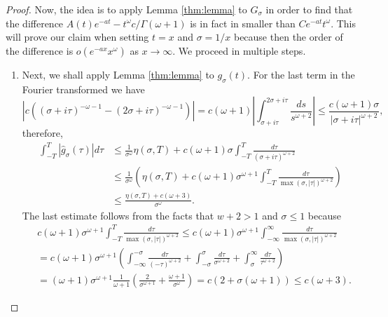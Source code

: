 \begin{proof}
Now, the idea is to apply Lemma \ref{thm:lemma} to $G_\sigma$ in order to find that the difference $A(t)e^{-at} - t^\omega c/\Gamma(\omega + 1)$ is in fact in smaller than $C e^{-at} t^\omega$. This will prove our claim when setting $t = x$ and $\sigma = 1/x$ because then the order of the difference is $o(e^{-ax} x^\omega)$ as $x \to \infty$.
We proceed in multiple steps.
\begin{enumerate}
    \item Next, we shall apply Lemma \ref{thm:lemma} to $g_\sigma(t)$. 
    For the last term in the Fourier transformed we have
    \begin{equation*}
        |c ( (\sigma + i\tau)^{-\omega-1} - (2\sigma + i\tau)^{-\omega - 1})| = c (\omega + 1) \left| \int_{\sigma + i\tau}^{2\sigma + i\tau} \frac{ds}{s^{\omega + 2}} \right| \leq \frac{c (\omega + 1)\sigma}{|\sigma + i\tau|^{\omega+2}}, 
    \end{equation*}
    therefore,  
    \begin{align}
        \int_{-T}^T |\hat{g}_\sigma(\tau)| d\tau 
        &\leq \frac{1}{\sigma^\omega} \eta(\sigma, T) + c (\omega + 1) \sigma \int_{-T}^T \frac{d\tau}{(\sigma + i\tau)^{\omega + 2}} \nonumber \\
        &\leq \frac{1}{\sigma^{\omega}} \left(  \eta(\sigma, T) + c (\omega + 1) \sigma^{\omega + 1}  \int_{-T}^T \frac{d\tau}{\max(\sigma, |\tau|)^{\omega + 2}}  \right) \nonumber \\
        &\leq \frac{\eta(\sigma, T) + c (\omega + 3)}{\sigma^{\omega}} \label{eq:ghatestimate}.
    \end{align}
    The last estimate follows from the facts that $w + 2 > 1$ and $\sigma \leq 1$ because
    \begin{align*}
        &c (\omega + 1) \sigma^{\omega + 1} \int_{-T}^T \frac{d\tau}{\max(\sigma, |\tau|)^{\omega + 2}}
        \leq c (\omega + 1) \sigma^{\omega + 1}  \int_{-\infty}^\infty \frac{d\tau}{\max(\sigma, |\tau|)^{\omega + 2}} \\
        &= c (\omega + 1) \sigma^{\omega + 1} \left( \int_{-\infty}^{-\sigma} \frac{d\tau}{(-\tau)^{\omega + 2}}
        + \int_{-\sigma}^\sigma \frac{d\tau}{\sigma^{\omega + 2}}
        + \int_\sigma^\infty \frac{d\tau}{\tau^{\omega + 2}} \right) \\
        &=  (\omega + 1) \sigma^{\omega + 1} \frac{1}{\omega + 1} \left(  \frac{2}{\sigma^{\omega+1}} + \frac{\omega + 1}{\sigma^\omega}  \right)
        = c (2 + \sigma (\omega + 1)) \leq c (\omega + 3).
    \end{align*}

\end{enumerate}
\end{proof}
